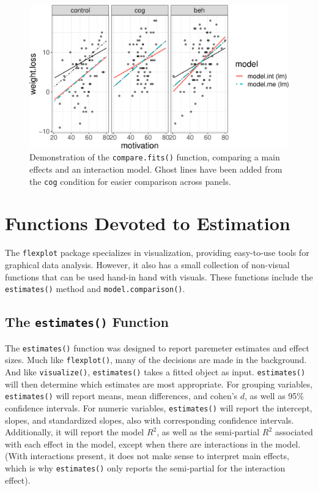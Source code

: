 \documentclass[
  man]{apa6}
\begin{document}
\begin{figure}
\centering
\includegraphics{flexplot_psychmeth_files/figure-latex/compare-1.pdf}
\caption{\label{fig:compare}Demonstration of the \texttt{compare.fits()} function, comparing a main effects and an interaction model. Ghost lines have been added from the \texttt{cog} condition for easier comparison across panels. \label{fig:compare}}
\end{figure}

\hypertarget{functions-devoted-to-estimation}{%
\section{Functions Devoted to Estimation}\label{functions-devoted-to-estimation}}

The \texttt{flexplot} package specializes in visualization, providing easy-to-use tools for graphical data analysis. However, it also has a small collection of non-visual functions that can be used hand-in hand with visuals. These functions include the \texttt{estimates()} method and \texttt{model.comparison()}.

\hypertarget{the-estimates-function}{%
\subsection{\texorpdfstring{The \texttt{estimates()} Function}{The estimates() Function}}\label{the-estimates-function}}

The \texttt{estimates()} function was designed to report paremeter estimates and effect sizes. Much like \texttt{flexplot()}, many of the decisions are made in the background. And like \texttt{visualize()}, \texttt{estimates()} takes a fitted object as input. \texttt{estimates()} will then determine which estimates are most appropriate. For grouping variables, \texttt{estimates()} will report means, mean differences, and cohen's \(d\), as well as 95\% confidence intervals. For numeric variables, \texttt{estimates()} will report the intercept, slopes, and standardized slopes, also with corresponding confidence intervals. Additionally, it will report the model \(R^2\), as well as the semi-partial \(R^2\) associated with each effect in the model, except when there are interactions in the model. (With interactions present, it does not make sense to interpret main effects, which is why \texttt{estimates()} only reports the semi-partial for the interaction effect).
\end{document}
